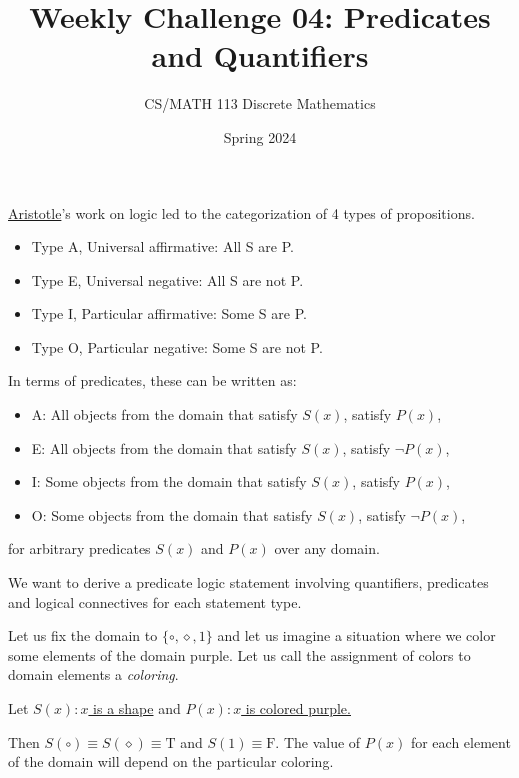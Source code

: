 \documentclass[a4paper]{exam}
\title{Weekly Challenge 04: Predicates and Quantifiers}
\author{CS/MATH 113 Discrete Mathematics}
\date{Spring 2024}
\newcommand\T{\ensuremath{\mathrm{T}}}
\newcommand\F{\ensuremath{\mathrm{F}}}
\begin{document}
\maketitle

\begin{questions}


  \href{https://en.wikipedia.org/wiki/Aristotle}{Aristotle}'s work on logic led to the categorization of 4 types of propositions.
  \begin{itemize}
  \item Type A, Universal affirmative: All S are P.
  \item Type E, Universal negative: All S are not P.
  \item Type I, Particular affirmative: Some S are P.
  \item Type O, Particular negative: Some S are not P.
  \end{itemize}

  In terms of predicates, these can be written as:
  \begin{itemize}
  \item A: All objects from the domain that satisfy $S(x)$, satisfy $P(x)$,
  \item E: All objects from the domain that satisfy $S(x)$, satisfy $\neg P(x)$,
  \item I: Some objects from the domain that satisfy $S(x)$, satisfy $P(x)$,
  \item O: Some objects from the domain that satisfy $S(x)$, satisfy $\neg P(x)$,
  \end{itemize}
  for arbitrary predicates $S(x)$ and $P(x)$ over any domain.

  We want to derive a predicate logic statement involving quantifiers, predicates and logical connectives for each statement type.

  Let us fix the domain to $\{\circ,\diamond,1\}$ and let us imagine a situation where we color some elements of the domain purple. Let us call the assignment of colors to domain elements a \textit{coloring}.

  Let \underline{$S(x): x$ is a shape} and \underline{$P(x): x$ is colored purple.}
  
  Then $S(\circ)\equiv S(\diamond)\equiv\T$ and $S(1)\equiv\F$. The value of $P(x)$ for each element of the domain will depend on the particular coloring.


\end{questions}
\end{document}
